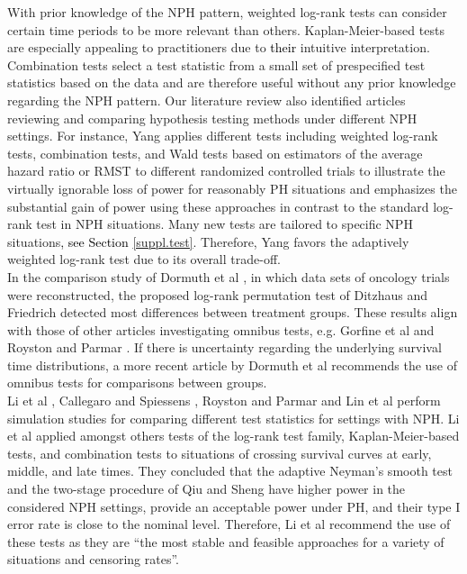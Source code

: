 \documentclass{article}
\newcommand{\NEW}[2][black]{\textcolor{#1}{#2}}
\begin{document}
\noindent 
With prior knowledge of the NPH pattern, weighted log-rank tests can consider certain time periods to be more relevant than others. Kaplan-Meier-based tests are especially appealing to practitioners due to \NEW{their} intuitive interpretation. Combination tests select a test statistic from a small set of prespecified test statistics based on the data and are therefore useful without any prior knowledge regarding the NPH pattern.
Our literature review also identified articles reviewing and comparing hypothesis testing methods under different NPH settings. For instance, Yang \cite{Yang.2019} applies different tests including weighted log-rank tests, combination tests, and Wald tests based on estimators of the average hazard ratio or RMST to different randomized controlled trials to illustrate the virtually ignorable loss of power for reasonably PH situations and emphasizes the substantial gain of power using these approaches in contrast to the standard log-rank test in NPH situations.
Many new tests are tailored to specific NPH situations\NEW{, see Section \ref{suppl.test}}. Therefore,  Yang \cite{Yang.2019} favors the adaptively weighted log-rank test due to its overall trade-off. 
\\
In the comparison study of Dormuth et al \cite{Dormuth.2022}, in which data sets of oncology trials were reconstructed, the proposed log-rank permutation test of Ditzhaus and Friedrich \cite{Ditzhaus.2020} detected most differences between treatment groups. These results align with those of other articles investigating omnibus tests, e.g. Gorfine et al \cite{Gorfine.2020} and Royston and Parmar \cite{Royston.2020}.
If there is uncertainty regarding the underlying survival time distributions, a more recent article by Dormuth et al \cite{Dormuth.2023} recommends the use of omnibus tests for comparisons between groups.
\\
Li et al \cite{Li.2015}, Callegaro and Spiessens \cite{Callegaro.2017}, Royston and Parmar \cite{Royston.2020} and Lin et al \cite{Lin.2020} perform simulation studies for comparing different test statistics for settings with NPH. 
Li et al \cite{Li.2015} applied amongst others tests of the log-rank test family, Kaplan-Meier-based tests, and combination tests to situations of crossing survival curves at early, middle, and late times. They concluded that the adaptive Neyman's smooth test \cite{Kraus.2009} and the two-stage procedure of Qiu and Sheng \cite{Qiu.2007} have higher power in the considered NPH settings, provide an acceptable power under PH, and their type I error rate is close to the nominal level. Therefore, Li et al \cite{Li.2015} recommend the use of these tests as they are ``the most stable and feasible approaches for a variety of situations and censoring rates''.
\end{document}
